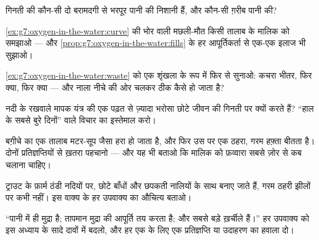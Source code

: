 \begin{exercise}[$\star$]\label{exo:g7:oxygen-in-the-water:6}
गिनती की कौन-सी दो बरामदगी  से भरपूर पानी की निशानी हैं, और
कौन-सी ग़रीब पानी की?
\end{exercise}

\begin{exercise}[$\star\star$]\label{exo:g7:oxygen-in-the-water:7}
\cref{ex:g7:oxygen-in-the-water:curve} की भोर वाली मछली-मौत किसी तालाब
के मालिक को समझाओ --- और \cref{prop:g7:oxygen-in-the-water:fills} के
हर आपूर्तिकर्ता से एक-एक इलाज भी सुझाओ।
\end{exercise}

\begin{exercise}[$\star\star$]\label{exo:g7:oxygen-in-the-water:8}
\cref{ex:g7:oxygen-in-the-water:waste} को एक शृंखला के रूप में फिर से
सुनाओ: कचरा भीतर, फिर क्या, फिर क्या --- और नाला नीचे की ओर चलकर ठीक
कैसे हो जाता है?
\end{exercise}

\begin{exercise}[$\star\star$]\label{exo:g7:oxygen-in-the-water:9}
नदी के रखवाले मापक यंत्र की एक पढ़त से ज़्यादा भरोसा छोटे जीवन की गिनती
पर क्यों करते हैं? ``हाल के सबसे बुरे दिनों'' वाले विचार का इस्तेमाल
करो।
\end{exercise}

\begin{exercise}[$\star\star$]\label{exo:g7:oxygen-in-the-water:10}
बग़ीचे का एक तालाब मटर-सूप जैसा हरा हो जाता है, और फिर उस पर एक ठहरा,
गरम हफ़्ता बीतता है। दोनों प्रतिज्ञप्तियों से ख़तरा पहचानो --- और यह भी
बताओ कि मालिक को फ़व्वारा सबसे ज़ोर से कब चलाना चाहिए।
\end{exercise}

\begin{exercise}[$\star\star$]\label{exo:g7:oxygen-in-the-water:11}
ट्राउट के फ़ार्म ठंडी नदियों पर, छोटे बाँधों और छपकती नालियों के साथ
बनाए जाते हैं, गरम ठहरी झीलों पर कभी नहीं। इस वाक्य के हर उपवाक्य का
औचित्य बताओ।
\end{exercise}

\begin{exercise}[$\star\star\star$]\label{exo:g7:oxygen-in-the-water:12}
``पानी में  ही मुद्रा है; तापमान मुद्रा की आपूर्ति तय करता है;
और  सबसे बड़े ख़र्चीले हैं।'' हर उपवाक्य को इस अध्याय के सादे दावों
में बदलो, और हर एक के लिए एक प्रतिज्ञप्ति या उदाहरण का हवाला दो।
\end{exercise}

